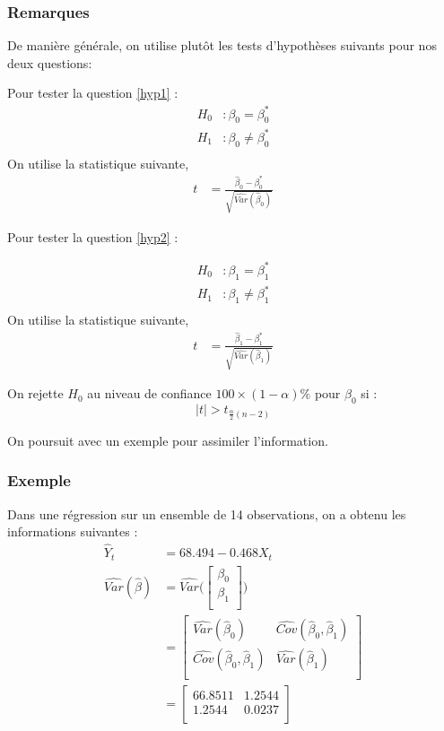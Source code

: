\documentclass[11pt,french]{report}
\begin{document}
\subsubsection*{Remarques}
De manière générale, on utilise plutôt les tests d'hypothèses suivants pour nos deux questions:

Pour tester la question \ref{hyp1} :
\begin{align*}
H_0 &: \beta_0 = \beta_0^* \\
H_1 &: \beta_0 \neq \beta_0^* \\
\end{align*}
On utilise la statistique suivante,
\begin{align*}
t &= \frac{\hat{\beta}_0 - \beta_0^* }{\sqrt{\widehat{Var}(\hat{\beta}_0)}}
\end{align*}

Pour tester la question  \ref{hyp2} :

\begin{align*}
H_0 &: \beta_1 = \beta_1^* \\
H_1 &: \beta_1 \neq \beta_1^* \\
\end{align*}
On utilise la statistique suivante,
\begin{align*}
t &= \frac{\hat{\beta}_1 - \beta_1^* }{\sqrt{\widehat{Var}(\hat{\beta}_1)}}
\end{align*}

On rejette $H_0$ au niveau de confiance $100 \times (1 - \alpha)\%$ pour $\beta_0$ si :
$$
|t| > t_{\frac{\alpha}{2}(n-2)}
$$

\bigskip
On poursuit avec un exemple pour assimiler l'information.

\subsubsection*{Exemple}
Dans une régression sur un ensemble de 14 observations, on a obtenu les informations suivantes :
\begin{align*}
\hat{Y}_t &= 68.494 - 0.468X_t \\
\widehat{Var}(\hat{\beta}) &= \widehat{Var}\Bigg(
\begin{bmatrix}
  \beta_0 \\
  \beta_1 \\ 
\end{bmatrix}\Bigg) \\
&= 
\begin{bmatrix}
  \widehat{Var}(\hat{\beta}_0) & \widehat{Cov}(\hat{\beta}_0, \hat{\beta}_1)\\
  \widehat{Cov}(\hat{\beta}_0, \hat{\beta}_1)  & \widehat{Var}(\hat{\beta}_1)\\ 
\end{bmatrix} \\
&= 
\begin{bmatrix}
  66.8511 & 1.2544\\
  1.2544 & 0.0237\\ 
\end{bmatrix} \\
\end{align*}
\end{document}
